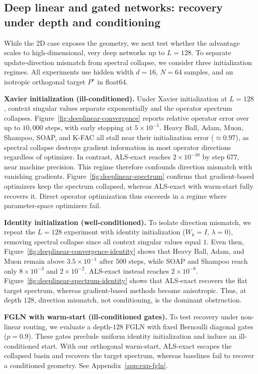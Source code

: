 \documentclass{article}
\begin{document}
\subsection{Deep linear and gated networks: recovery under depth and conditioning}
\label{sec:exp-deeplinear}
While the 2D case exposes the geometry, we next test whether the advantage scales to high-dimensional, very deep networks up to $L=128$. To separate update-direction mismatch from spectral collapse, we consider three initialization regimes. All experiments use hidden width $d=16$, $N=64$ samples, and an isotropic orthogonal target $P^\star$ in float64.

\textbf{Xavier initialization (ill-conditioned).}
Under Xavier initialization at $L=128$, context singular values separate exponentially and the operator spectrum collapses. Figure~\ref{fig:deeplinear-convergence} reports relative operator error over up to $10{,}000$ steps, with early stopping at $5\times10^{-5}$. Heavy Ball, Adam, Muon, Shampoo, SOAP, and K-FAC all stall near their initialization error ($\approx 0.97$), as spectral collapse destroys gradient information in most operator directions regardless of optimizer. In contrast, ALS-exact reaches $2\times10^{-10}$ by step $677$, near machine precision. This regime therefore confounds direction mismatch with vanishing gradients. Figure~\ref{fig:deeplinear-spectrum} confirms that gradient-based optimizers keep the spectrum collapsed, whereas ALS-exact with warm-start fully recovers it. Direct operator optimization thus succeeds in a regime where parameter-space optimizers fail.

\textbf{Identity initialization (well-conditioned).}
To isolate direction mismatch, we repeat the $L=128$ experiment with identity initialization ($W_k=I$, $\lambda=0$), removing spectral collapse since all context singular values equal $1$. Even then, Figure~\ref{fig:deeplinear-convergence-identity} shows that Heavy Ball, Adam, and Muon remain above $3.5\times10^{-1}$ after $500$ steps, while SOAP and Shampoo reach only $8\times10^{-3}$ and $2\times10^{-2}$. ALS-exact instead reaches $2\times10^{-8}$. Figure~\ref{fig:deeplinear-spectrum-identity} shows that ALS-exact recovers the flat target spectrum, whereas gradient-based methods become anisotropic. Thus, at depth $128$, direction mismatch, not conditioning, is the dominant obstruction.

\textbf{FGLN with warm-start (ill-conditioned gates).}
To test recovery under non-linear routing, we evaluate a depth-$128$ FGLN with fixed Bernoulli diagonal gates ($p=0.9$). These gates preclude uniform identity initialization and induce an ill-conditioned start. With our orthogonal warm-start, ALS-exact escapes the collapsed basin and recovers the target spectrum, whereas baselines fail to recover a conditioned geometry. See Appendix~\ref{app:exp-fgln}.
\end{document}
